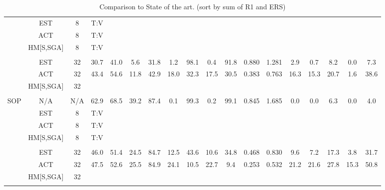 \begin{table*}
{\begin{tabular}{c|cc|cccc|ccccc|ccccc|c}
\cline{2-18} \cline{3-18} \cline{4-18} \cline{5-18} \cline{6-18} \cline{7-18} \cline{8-18} \cline{9-18} \cline{10-18} \cline{11-18} \cline{12-18} \cline{13-18} \cline{14-18} \cline{15-18} \cline{16-18} \cline{17-18} \cline{18-18} 
 & EST & 8 & T:V &  &  &  &  &  &  &  &  &  &  &  &  &  & \tabularnewline
 & ACT & 8 & T:V &  &  &  &  &  &  &  &  &  &  &  &  &  & \tabularnewline
 & HM{[}S,SGA{]} & 8 & T:V &  &  &  &  &  &  &  &  &  &  &  &  &  & \tabularnewline
 &  &  &  &  &  &  &  &  &  &  &  &  &  &  &  &  & \tabularnewline
\cline{2-18} \cline{3-18} \cline{4-18} \cline{5-18} \cline{6-18} \cline{7-18} \cline{8-18} \cline{9-18} \cline{10-18} \cline{11-18} \cline{12-18} \cline{13-18} \cline{14-18} \cline{15-18} \cline{16-18} \cline{17-18} \cline{18-18} 
 & EST & 32 & 30.7 & 41.0 & 5.6 & 31.8 & 1.2 & 98.1 & 0.4 & 91.8 & 0.880 & 1.281 & 2.9 & 0.7 & 8.2 & 0.0 & 7.3\tabularnewline
 & ACT & 32 & 43.4 & 54.6 & 11.8 & 42.9 & 18.0 & 32.3 & 17.5 & 30.5 & 0.383 & 0.763 & 16.3 & 15.3 & 20.7 & 1.6 & 38.6\tabularnewline
 & HM{[}S,SGA{]} & 32 &  &  &  &  &  &  &  &  &  &  &  &  &  &  & \tabularnewline
 &  &  &  &  &  &  &  &  &  &  &  &  &  &  &  &  & \tabularnewline
\hline 
\hline 
SOP & N/A & N/A & 62.9 & 68.5 & 39.2 & 87.4 & 0.1 & 99.3 & 0.2 & 99.1 & 0.845 & 1.685 & 0.0 & 0.0 & 6.3 & 0.0 & 4.0\tabularnewline
\cline{2-18} \cline{3-18} \cline{4-18} \cline{5-18} \cline{6-18} \cline{7-18} \cline{8-18} \cline{9-18} \cline{10-18} \cline{11-18} \cline{12-18} \cline{13-18} \cline{14-18} \cline{15-18} \cline{16-18} \cline{17-18} \cline{18-18} 
 & EST & 8 & T:V &  &  &  &  &  &  &  &  &  &  &  &  &  & \tabularnewline
 & ACT & 8 & T:V &  &  &  &  &  &  &  &  &  &  &  &  &  & \tabularnewline
 & HM{[}S,SGA{]} & 8 & T:V &  &  &  &  &  &  &  &  &  &  &  &  &  & \tabularnewline
 &  &  &  &  &  &  &  &  &  &  &  &  &  &  &  &  & \tabularnewline
\cline{2-18} \cline{3-18} \cline{4-18} \cline{5-18} \cline{6-18} \cline{7-18} \cline{8-18} \cline{9-18} \cline{10-18} \cline{11-18} \cline{12-18} \cline{13-18} \cline{14-18} \cline{15-18} \cline{16-18} \cline{17-18} \cline{18-18} 
 & EST & 32 & 46.0 & 51.4 & 24.5 & 84.7 & 12.5 & 43.6 & 10.6 & 34.8 & 0.468 & 0.830 & 9.6 & 7.2 & 17.3 & 3.8 & 31.7\tabularnewline
 & ACT & 32 & 47.5 & 52.6 & 25.5 & 84.9 & 24.1 & 10.5 & 22.7 & 9.4 & 0.253 & 0.532 & 21.2 & 21.6 & 27.8 & 15.3 & 50.8\tabularnewline
 & HM{[}S,SGA{]} & 32 &  &  &  &  &  &  &  &  &  &  &  &  &  &  & \tabularnewline
 &  &  &  &  &  &  &  &  &  &  &  &  &  &  &  &  & \tabularnewline
\end{tabular}}

\caption{Comparison to State of the art. (sort by sum of R1 and ERS)}
\end{table*}
